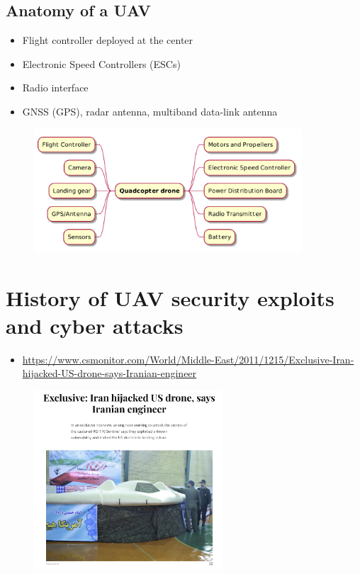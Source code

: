 \subsection{Anatomy of a UAV}
\begin{frame}{\insertsubsection}
    \begin{itemize}
        \item Flight controller deployed at the center
        \item Electronic Speed Controllers (ESCs)
        \item Radio interface
        \item GNSS (GPS), radar antenna, multiband data-link antenna
    \end{itemize}
    
    \begin{figure}[h]
        \centering
        \includegraphics[width=10cm]{img/quadcopter.png}
        \label{fig:quadcopter}
    \end{figure}
\end{frame}

\section{History of UAV security exploits and cyber attacks}
\begin{frame}{\insertsection}
    \begin{itemize}
        \item \url{https://www.csmonitor.com/World/Middle-East/2011/1215/Exclusive-Iran-hijacked-US-drone-says-Iranian-engineer}
    \end{itemize}
    
    \begin{figure}[h]
        \centering
        \includegraphics[width=7cm]{img/iran.png}
        \label{fig:iran}
    \end{figure}
\end{frame}

